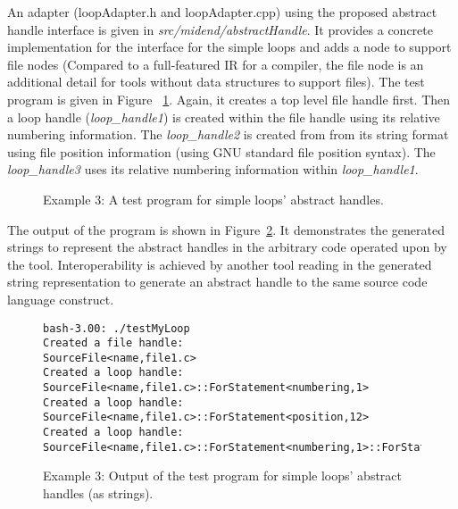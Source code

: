 An adapter (loopAdapter.h and loopAdapter.cpp) using the proposed abstract
handle interface is given in \textit{src/midend/abstractHandle}.
It provides a concrete implementation for the interface for the simple loops and adds a
node to support file nodes (Compared to a full-featured IR for a compiler, the
file node is an additional detail for tools without data structures to support files).
The test program is given in Figure ~\ref{Tutorial:testMyLoop}.
Again, it creates a top level file handle first. Then a loop handle
({\em loop\_handle1}) is created within the file handle using its relative numbering information. 
The {\em loop\_handle2} is created from from its string format using file position
information (using GNU standard file position syntax). The {\em loop\_handle3} uses its
relative numbering information within {\em loop\_handle1}.

\begin{figure}[!h]
{\indent
{\mySmallestFontSize
\begin{latexonly}
  
\end{latexonly}

\begin{htmlonly}
   
\end{htmlonly}

}
}
\caption{Example 3: A test program for simple loops' abstract handles.}
\label{Tutorial:testMyLoop}
\end{figure}


The output of the program is shown in Figure~\ref{Tutorial:testMyLoopOutput}.  It
demonstrates the generated strings to represent the abstract handles in the 
arbitrary code operated upon by the tool.  Interoperability is achieved by 
another tool reading in the generated string representation to generate an
abstract handle to the same source code language construct.
\begin{figure}[!h]
{\indent
{\mySmallestFontSize
\begin{latexonly}
\begin{lstlisting} 
bash-3.00: ./testMyLoop
Created a file handle:
SourceFile<name,file1.c>
Created a loop handle:
SourceFile<name,file1.c>::ForStatement<numbering,1>
Created a loop handle:
SourceFile<name,file1.c>::ForStatement<position,12>
Created a loop handle:
SourceFile<name,file1.c>::ForStatement<numbering,1>::ForStatement<numbering,1>
\end{lstlisting}
\end{latexonly}
}
}
\caption{Example 3: Output of the test program for simple loops' abstract handles (as strings).}
\label{Tutorial:testMyLoopOutput}
\end{figure}

